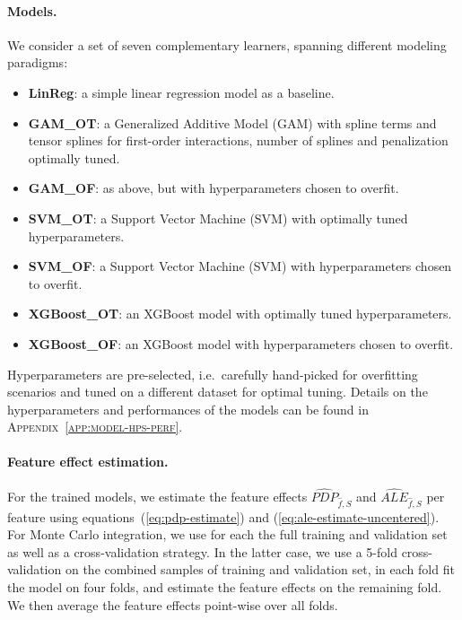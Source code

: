 \documentclass[runningheads]{llncs}
\begin{document}
\paragraph{Models.}
We consider a set of seven complementary learners, spanning different modeling
paradigms:

\begin{itemize}[label=--]
    \item \textbf{LinReg}: a simple linear regression model as a baseline.
    \item \textbf{GAM\_OT}: a Generalized Additive Model (GAM) with spline terms
          and tensor splines for first-order interactions, number of splines
          and penalization optimally tuned.
    \item \textbf{GAM\_OF}: as above, but with hyperparameters chosen to overfit.
    \item \textbf{SVM\_OT}: a Support Vector Machine (SVM) with optimally tuned hyperparameters.
    \item \textbf{SVM\_OF}: a Support Vector Machine (SVM) with hyperparameters chosen to overfit.
    \item \textbf{XGBoost\_OT}: an XGBoost model with optimally tuned hyperparameters.
    \item \textbf{XGBoost\_OF}: an XGBoost model with hyperparameters chosen to overfit.
\end{itemize}

\noindent Hyperparameters are pre-selected, i.e.\ carefully hand-picked for overfitting scenarios
and tuned on a different dataset for optimal tuning. Details on the hyperparameters and performances
of the models can be found in \textsc{Appendix~\ref{app:model-hps-perf}}.

\paragraph{Feature effect estimation.}
For the trained models, we estimate the feature effects
$\widehat{PDP}_{\hat{f},S}$ and $\widehat{ALE}_{\hat f,S}$ per feature using
equations~(\ref{eq:pdp-estimate}) and (\ref{eq:ale-estimate-uncentered}). For
Monte Carlo integration, we use for each the full training and validation set
as well as a cross-validation strategy. In the latter case, we use a 5-fold
cross-validation on the combined samples of training and validation set, in
each fold fit the model on four folds, and estimate the feature effects on the
remaining fold. We then average the feature effects point-wise over all folds.
\end{document}
